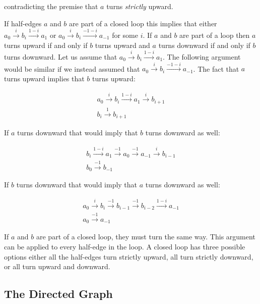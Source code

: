 \documentclass[acmtog]{acmart}
\begin{document}
\noindent contradicting the premise that $a$ turns \textit{strictly} upward.

If half-edges $a$ and $b$ are part of a closed loop this implies that either
$a_0 \xrightarrow{i} b_i \xrightarrow{ 1-i} a_1$ or
$a_0 \xrightarrow{i} b_i \xrightarrow{-1-i} a_{-1}$ for some $i$. If $a$ and $b$
are part of a loop then $a$ turns upward if and only if $b$ turns upward and
$a$ turns downward if and only if $b$ turns downward. Let us assume that
$a_0 \xrightarrow{i} b_i \xrightarrow{ 1-i} a_1$. The following argument would
be similar if we instead assumed that
$a_0 \xrightarrow{i} b_i \xrightarrow{-1-i} a_{-1}$.
The fact that $a$ turns upward implies that $b$ turns upward:

\begin{equation}
\begin{split}
a_0 \xrightarrow{i} b_i \xrightarrow{1-i} a_1 \xrightarrow{i} b_{i+1} \\
b_i \xrightarrow{1} b_{i+1}
\end{split}
\end{equation}

If $a$ turns downward that would imply that $b$ turns downward as well:

\begin{equation}
\begin{split}
b_i \xrightarrow{1-i} a_1 \xrightarrow{-1} a_0 \xrightarrow{-1} a_{-1} \xrightarrow{i} b_{i-1} \\
b_0 \xrightarrow{-1} b_{-1}
\end{split}
\end{equation}

If $b$ turns downward that would imply that $a$ turns downward as well:

\begin{equation}
\begin{split}
a_0 \xrightarrow{i} b_i \xrightarrow{-1} b_{i-1} \xrightarrow{-1} b_{i-2} \xrightarrow{1-i} a_{-1} \\
a_0 \xrightarrow{-1} a_{-1}
\end{split}
\end{equation}

If $a$ and $b$ are part of a closed loop, they must turn the same way.
This argument can be applied to every half-edge in the loop. A closed loop
has three possible options either all the half-edges turn strictly upward, all
turn strictly downward, or all turn upward and downward.

\subsection{The Directed Graph}
\end{document}
